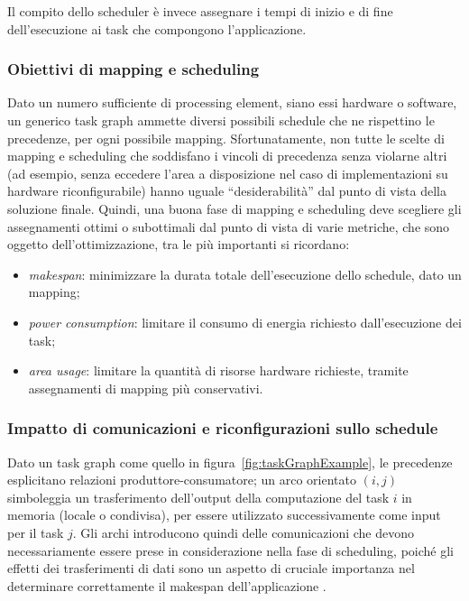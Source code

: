 Il compito dello scheduler è invece assegnare i tempi di inizio e di fine dell'esecuzione ai
task che compongono l'applicazione.


\subsubsection{Obiettivi di mapping e scheduling}
Dato un numero sufficiente di processing element, siano essi hardware o software, un generico
task graph ammette diversi possibili schedule che ne rispettino le 
precedenze, per ogni possibile mapping. Sfortunatamente, non tutte le scelte di mapping e scheduling
che soddisfano i vincoli di precedenza senza violarne altri (ad esempio, senza eccedere l'area a disposizione
nel caso di implementazioni su hardware riconfigurabile)
hanno uguale ``desiderabilità'' dal punto di vista della soluzione finale. Quindi, una buona fase
di mapping e scheduling deve scegliere gli assegnamenti ottimi o subottimali dal punto di vista di
varie metriche, che sono oggetto dell'ottimizzazione, tra le più importanti si ricordano:
\begin{itemize}
 \item \emph{makespan}: minimizzare la durata totale dell'esecuzione dello schedule, dato un mapping;
 \item \emph{power consumption}: limitare il consumo di energia richiesto 
    dall'esecuzione dei task;
  \item \emph{area usage}: limitare la quantit\`a di risorse hardware richieste,
    tramite assegnamenti di mapping pi\`u conservativi.
\end{itemize}


\subsubsection{Impatto di comunicazioni e riconfigurazioni sullo schedule}
Dato un task graph come quello in figura~\ref{fig:taskGraphExample},
le precedenze esplicitano relazioni produttore-consumatore;
un arco orientato $(i,j)$ simboleggia un trasferimento dell'output della
computazione del task $i$ in memoria (locale o condivisa), per essere utilizzato
successivamente come input per il task $j$.
Gli archi introducono quindi delle
comunicazioni che devono necessariamente essere prese in considerazione nella fase 
di scheduling, poich\'e gli effetti dei trasferimenti di dati sono un aspetto
di cruciale importanza nel determinare correttamente il makespan dell'applicazione \cite{AntColonyOptimization}.

